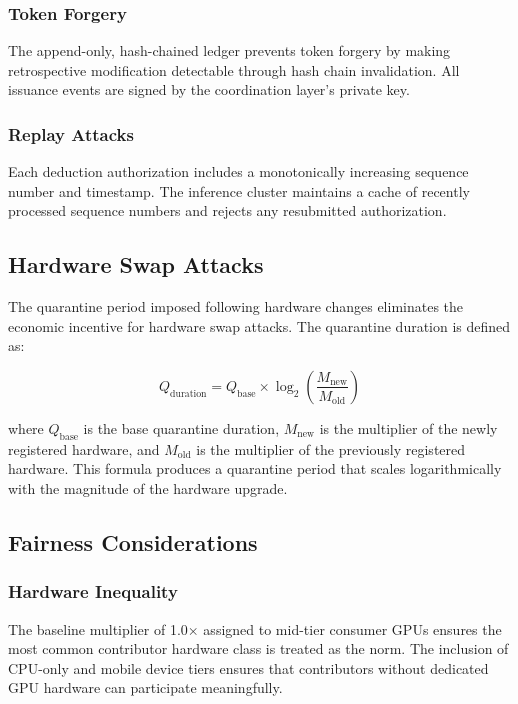 \documentclass[12pt]{article}
\begin{document}
\subsubsection{Token Forgery}

The append-only, hash-chained ledger prevents token forgery by making retrospective modification detectable through hash chain invalidation. All issuance events are signed by the coordination layer's private key.

\subsubsection{Replay Attacks}

Each deduction authorization includes a monotonically increasing sequence number and timestamp. The inference cluster maintains a cache of recently processed sequence numbers and rejects any resubmitted authorization.

\subsection{Hardware Swap Attacks}

The quarantine period imposed following hardware changes eliminates the economic incentive for hardware swap attacks. The quarantine duration is defined as:

\begin{equation}
Q_{\text{duration}} = Q_{\text{base}} \times \log_2\!\left(\frac{M_{\text{new}}}{M_{\text{old}}}\right)
\label{eq:quarantine}
\end{equation}

where $Q_{\text{base}}$ is the base quarantine duration, $M_{\text{new}}$ is the multiplier of the newly registered hardware, and $M_{\text{old}}$ is the multiplier of the previously registered hardware. This formula produces a quarantine period that scales logarithmically with the magnitude of the hardware upgrade.

\subsection{Fairness Considerations}

\subsubsection{Hardware Inequality}

The baseline multiplier of 1.0$\times$ assigned to mid-tier consumer GPUs ensures the most common contributor hardware class is treated as the norm. The inclusion of CPU-only and mobile device tiers ensures that contributors without dedicated GPU hardware can participate meaningfully.
\end{document}
